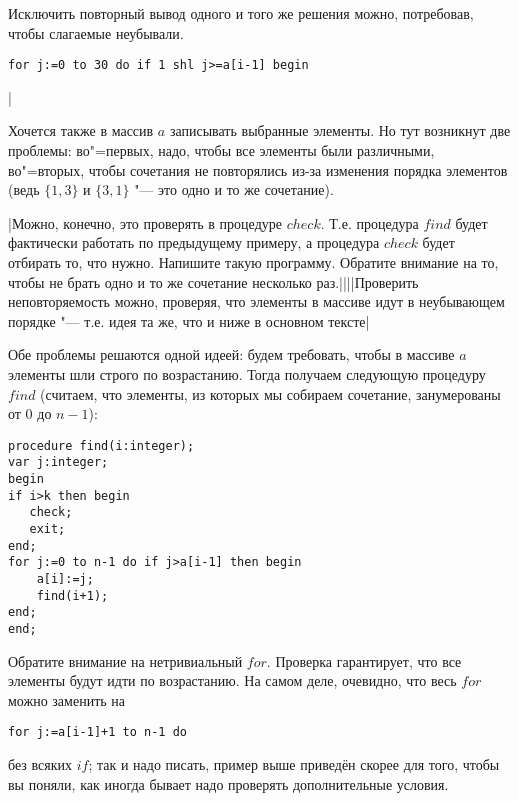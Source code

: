 Исключить повторный вывод одного и того же решения можно, потребовав, чтобы слагаемые неубывали.
\begin{codesampleo}\begin{verbatim}
for j:=0 to 30 do if 1 shl j>=a[i-1] begin
\end{verbatim}
\end{codesampleo}
|



 Хочется также в массив $a$ 
записывать выбранные элементы. Но тут возникнут две  
проблемы: во"=первых, надо, чтобы все элементы были различными, во"=вторых, чтобы 
сочетания не повторялись из-за изменения порядка элементов (ведь $\{1,3\}$ и $\{3,1\}$ 
"--- это одно и то же сочетание).

\task|Можно, конечно, это проверять в процедуре $check$. Т.е. процедура $find$ 
будет фактически работать по предыдущему примеру, а процедура $check$ будет отбирать то, 
что нужно. Напишите такую программу. Обратите внимание на то, чтобы не 
брать одно и то же сочетание несколько раз.||||Проверить неповторяемость можно, проверяя, что 
элементы в массиве идут в неубывающем порядке "--- т.е. идея та же, что и ниже в основном тексте|

Обе проблемы решаются одной идеей: будем требовать, чтобы в массиве $a$ элементы 
шли строго по возрастанию. Тогда получаем следующую процедуру $find$ (считаем, что 
элементы, из которых мы собираем сочетание, занумерованы от $0$ до $n-1$): 

\begin{codesampleo}\begin{verbatim}
procedure find(i:integer);
var j:integer;
begin
if i>k then begin
   check;
   exit;
end;
for j:=0 to n-1 do if j>a[i-1] then begin
    a[i]:=j;
    find(i+1);
end;
end;
\end{verbatim}
\end{codesampleo}


Обратите внимание на нетривиальный $for$. Проверка гарантирует, что все элементы 
будут идти по возрастанию. На самом деле, очевидно, что весь $for$ можно заменить на 

\begin{codesampleo}\begin{verbatim}
for j:=a[i-1]+1 to n-1 do
\end{verbatim}
\end{codesampleo}
без всяких $if$; так и надо писать, пример выше приведён скорее для того, чтобы 
вы поняли, как иногда бывает надо проверять дополнительные условия.

